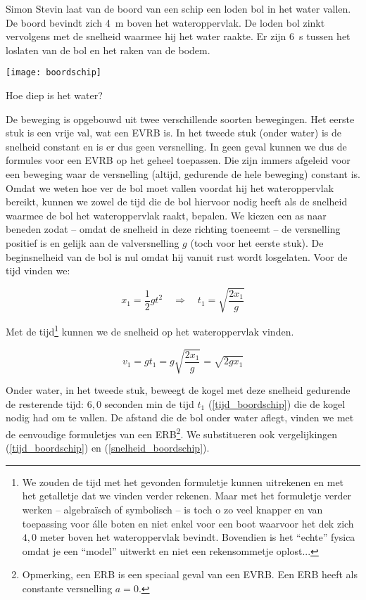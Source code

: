 \documentclass{ximera}
\begin{document}
\begin{exercise}
Simon Stevin laat van de boord van een schip een loden bol in het water vallen. De \mbox{boord} bevindt zich \SI{4}{\meter} boven het wateroppervlak. De loden bol zinkt vervolgens met de snelheid waarmee hij het water raakte. Er zijn \SI{6}{\second} tussen het loslaten van de bol en het raken van de bodem. 

\begin{image}
	\texttt{[image: boordschip]}
\end{image}

\begin{question} Hoe diep is het water? 
\begin{oplossing}

	De beweging is opgebouwd uit twee verschillende soorten bewegingen. Het eerste stuk is een vrije val, wat een EVRB is. In het tweede stuk (onder water) is de snelheid constant en is er dus geen versnelling. In geen geval kunnen we dus de formules voor een EVRB op het geheel toepassen. Die zijn immers afgeleid voor een beweging waar de versnelling (altijd, gedurende de hele beweging) constant is. \\

	Omdat we weten hoe ver de bol moet vallen voordat hij het wateroppervlak bereikt, kunnen we zowel de tijd die de bol hiervoor nodig heeft als de snelheid waarmee de bol het wateroppervlak raakt, bepalen. We kiezen een as naar beneden zodat -- omdat de snelheid in deze richting toeneemt -- de versnelling positief is en gelijk aan de valversnelling $g$ (toch voor het eerste stuk). De beginsnelheid van de bol is nul omdat hij vanuit rust wordt losgelaten. Voor de tijd vinden we:
	
	\[
	x_1=\frac{1}{2}gt^2\quad\Rightarrow\quad t_1=\sqrt{\frac{2x_1}{g}}
	\]
	
	Met de tijd\footnote{We zouden de tijd met het gevonden formuletje kunnen uitrekenen en met het getalletje dat we vinden verder rekenen. Maar met het formuletje verder werken -- algebra\"isch of symbolisch -- is toch o zo veel knapper en van toepassing voor \'alle boten en niet enkel voor een boot waarvoor het dek zich $4,0$ meter boven het wateroppervlak bevindt. Bovendien is het ``echte'' fysica omdat je een ``model'' uitwerkt en niet een rekensommetje oplost...} kunnen we de snelheid op het wateroppervlak vinden.
	
	\[
	v_1=gt_1\nonumber=g\sqrt{\frac{2x_1}{g}}\nonumber=\sqrt{2gx_1}
	\]
	
	Onder water, in het tweede stuk, beweegt de kogel met deze snelheid gedurende de resterende tijd: $6,0$ seconden min de tijd $t_1$ (\ref{tijd_boordschip}) die de kogel nodig had om te vallen. De afstand die de bol onder water aflegt, vinden we met de eenvoudige formuletjes van een ERB\footnote{Opmerking, een ERB is een speciaal geval van een EVRB. Een ERB heeft als constante versnelling $a=0$.}. We substitueren ook vergelijkingen (\ref{tijd_boordschip}) en (\ref{snelheid_boordschip}).
	

\end{oplossing}
\end{question}
\end{exercise}
\end{document}
